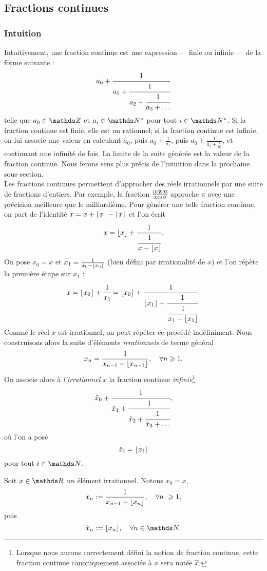 \subsection{Fractions continues}
\subsubsection{Intuition}

Intuitivement, une fraction continue est une expression — finie ou infinie — de
la forme suivante : \[a_0 + \cfrac{1}{a_1 + \cfrac{1}{a_2 + \cfrac{1}{a_3 +
\dots}}}\] telle que $a_0\in \Z$ et $a_i \in \N^*$ pour tout $i\in \N^*$.  Si
la fraction continue est finie, elle est un rationnel; si la fraction continue
est infinie, on lui associe une valeur en calculant $a_0$, puis $a_0 +
\frac{1}{a_1}$, puis $a_0 + \frac{1}{a_1 +\frac{1}{a_2}}$, et continuant une
infinité de fois. La limite de la suite générée est la \og{} valeur \fg{} de la
fraction continue. Nous ferons sens plus précis de l'intuition dans la
prochaine sous-section. \\

Les fractions continues permettent d'approcher des réels irrationnels par une
suite de fractions d'entiers.  Par exemple, la fraction $\frac{103 993}{33
102}$ approche $\pi$ avec une précision meilleure que le milliardième. Pour
générer une telle fraction continue, on part de l'identité $x = x + \lfloor x\rfloor -
\lfloor x\rfloor$ et l'on écrit \[x = \lfloor x\rfloor + \cfrac{1}{\cfrac{1}{x - \lfloor x\rfloor}}.\] On
pose $x_0 = x$ et $x_1 = \frac{1}{x_0 - \lfloor x_0\rfloor}$ (bien défini par
irrationalité de $x$) et l'on répète la première étape sur $x_1$ : \[x =
\lfloor x_0\rfloor + \cfrac{1}{x_1} = \lfloor x_0\rfloor + \cfrac{1}{\lfloor x_1\rfloor +
\cfrac{1}{\cfrac{1}{x_1 - \lfloor x_1\rfloor}}}.\] Comme le réel $x$ est irrationnel, on
peut répéter ce procédé indéfiniment. Nous construisons alors la suite
d'éléments \emph{irrationnels} de terme général \[x_n = \frac{1}{x_{n-1} -
\lfloor x_{n-1}\rfloor}, \quad \forall n \geqslant 1.\] On associe alors à
\emph{l'irrationnel} $x$ la fraction continue \emph{infinie}\footnote{Lorsque
nous aurons correctement défini la notion de fraction continue, cette fraction
continue canoniquement associée à $x$ sera notée $\hat{x}$.} \[\hat{x}_0 +
\cfrac{1}{\hat{x}_1 + \cfrac{1}{\hat{x}_2 + \cfrac{1}{\hat{x}_3 + \dots}}},\]
où l'on a posé \[\hat{x}_i = \lfloor x_i\rfloor\] pour tout $i\in \N$.

\begin{notation}\label{notations}
	Soit $x\in \R$ un élément irrationnel. Notons $x_0 = x$, \[x_n :=
	\frac{1}{x_{n-1} - \ent{x_n}}, \quad \forall n \geq 1,\] puis \[\hat{x}_n
	:= \ent{x_n}, \quad \forall n\in \N.\]
\end{notation}

